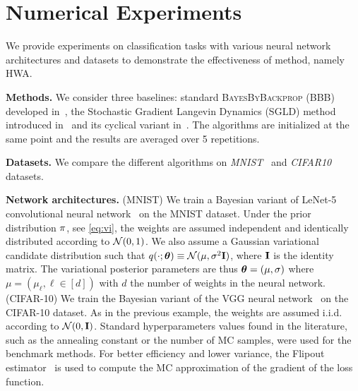 \documentclass[tablecaption=bottom,wcp]{jmlr}
\begin{document}
\section{Numerical Experiments}\label{sec:numerical}
We provide experiments on classification tasks with various neural network architectures and datasets to demonstrate the effectiveness of method, namely HWA.

\vspace{0.08in}
\noindent \textbf{Methods.}\hspace{0.1in}
We consider three baselines: standard \textsc{BayesByBackprop} (BBB) developed in~\citep{blundell2015weight}, the Stochastic Gradient Langevin Dynamics (SGLD) method introduced in~\citep{welling2011bayesian} and its cyclical variant in~\citep{zhang2019cyclical}.
The algorithms are initialized at the same point and the results are averaged over 5 repetitions.

\vspace{0.08in}
\noindent \textbf{Datasets.}\hspace{0.1in}
We compare the different algorithms on \textit{MNIST}~\citep{lecun-mnisthandwrittendigit-2010} and \textit{CIFAR10}~\citep{krizhevsky2009learning} datasets.

\vspace{0.08in}
\noindent \textbf{Network architectures.} \hspace{0.1in}
(MNIST) We train a Bayesian variant of LeNet-5 convolutional neural network~\citep{lecun1998gradient} on the MNIST dataset. 
Under the prior distribution $\prior$, see \eqref{eq:vi}, the weights are assumed independent and identically distributed according to ${\cal N}(0,1)$.
We also assume a Gaussian variational candidate distribution such that $q(\cdot; \param) \equiv  \mathcal{N}(\mu,\sigma^2 \Id )$, where $\Id$ is the identity matrix.
The variational posterior parameters are thus $\param = (\mu, \sigma) $ where $\mu = (\mu_\ell, \ell \in [d])$ with $d$ the number of weights in the neural network. 
(CIFAR-10) We train the Bayesian variant of the VGG neural network~\citep{simonyan2014very} on the CIFAR-10 dataset.
As in the previous example, the weights are assumed i.i.d. according to ${\cal N}(0,\Id)$.
Standard hyperparameters values found in the literature, such as the annealing constant or the number of MC samples, were used for the benchmark methods. 
For better efficiency and lower variance, the Flipout estimator~\citep{wen2018flipout} is used to compute the MC approximation of the gradient of the loss function.
\end{document}
